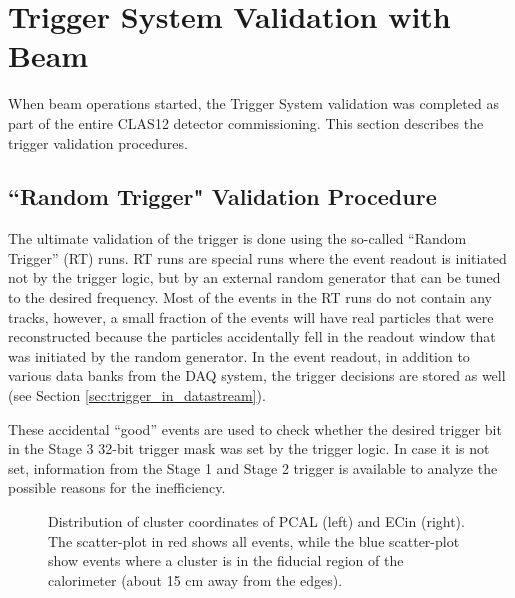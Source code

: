 \section{Trigger System Validation with Beam}
\label{sec:validation}

When beam operations started, the Trigger System validation was completed as part of the entire CLAS12 detector commissioning. This section describes the trigger validation procedures. 

\subsection{``Random Trigger" Validation Procedure}
\label{sec:validation_random}

The ultimate validation of the trigger is done using the so-called ``Random Trigger'' (RT) runs. RT runs are special runs where the event readout is initiated not by the trigger logic, but by an external random generator that can be tuned to the desired frequency. Most of the events in the RT runs do not contain any tracks, however, a small fraction of the events will have real particles that were reconstructed because the particles accidentally fell in the readout window that was initiated by the random generator. In the event readout, in addition to various data banks from the DAQ system, the trigger decisions are stored as well (see Section \ref{sec:trigger_in_datastream}).

These accidental ``good'' events are used to check whether the desired trigger bit in the Stage 3 32-bit trigger mask was set by the trigger logic. In case it is not set, information from the Stage 1 and Stage 2 trigger is available to analyze the possible reasons for the inefficiency.

\begin{figure}[!htb]
	\centering
	\caption{Distribution of cluster coordinates of PCAL (left) and EC{in} (right).
		The scatter-plot in red shows all events, while the blue scatter-plot show events where a cluster
		is in the fiducial region of the calorimeter (about 15 cm away from the edges).}
	\label{fig:pcal_clusters}
\end{figure}

